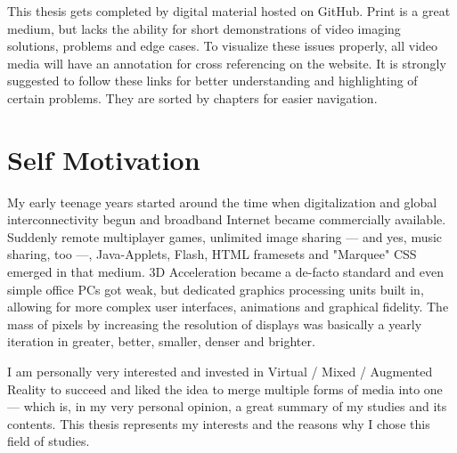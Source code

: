 This thesis gets completed by digital material hosted on GitHub. Print is a 
great medium, but lacks the ability for short demonstrations of video imaging 
solutions, problems and edge cases. To visualize these issues properly, all 
video media will have an annotation for cross referencing on the website. It is 
strongly suggested to follow these links for better understanding and 
highlighting of certain problems. They are sorted by chapters for easier 
navigation.

\section{Self Motivation}
\label{sec:intro:self-motivation}

My early teenage years started around the time when digitalization and global
interconnectivity begun and broadband Internet became commercially available.
Suddenly remote multiplayer games, unlimited image sharing --- and yes, music
sharing, too ---, Java-Applets, Flash, HTML framesets and "Marquee" CSS emerged 
in that medium. 3D Acceleration became a de-facto standard and even simple 
office PCs got weak, but dedicated graphics processing units built in, allowing 
for more complex user interfaces, animations and graphical fidelity. The mass 
of pixels by increasing the resolution of displays was basically a yearly 
iteration in greater, better, smaller, denser and brighter.

I am personally very interested and invested in Virtual / Mixed / Augmented 
Reality to succeed and liked the idea to merge multiple forms of media into one 
--- which is, in my very personal opinion, a great summary of my studies and 
its contents. This thesis represents my interests and the reasons why I chose 
this field of studies.